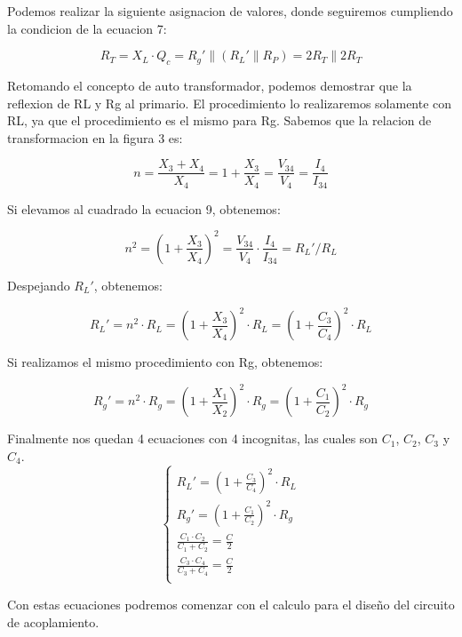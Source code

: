 Podemos realizar la siguiente asignacion de valores, donde seguiremos cumpliendo la condicion de la ecuacion 7:

\begin{equation}
    R_T = X_L \cdot Q_c = R_g' \parallel (R_L' \parallel R_P) = 2 R_T \parallel 2 R_T 
\end{equation}

Retomando el concepto de auto transformador, podemos demostrar que la reflexion de RL y Rg al primario. El procedimiento lo realizaremos solamente con RL, ya que el procedimiento es el mismo para Rg.
Sabemos que la relacion de transformacion en la figura 3 es:

\begin{equation}
    n = \frac{X_3+X_4}{X_4} = 1 + \frac{X_3}{X_4} = \frac{V_{34}}{V_4} = \frac{I_4}{I_{34}}
\end{equation}

Si elevamos al cuadrado la ecuacion 9, obtenemos:

\begin{equation}
    n^2 = (1 + \frac{X_3}{X_4})^2 = \frac{V_{34}}{V_4} \cdot \frac{I_4}{I_{34}} = R_L' / R_L
\end{equation}

Despejando $R_L'$, obtenemos:

\begin{equation}
    R_L' = n^2 \cdot R_L = (1 + \frac{X_3}{X_4})^2 \cdot R_L = (1 + \frac{C_3}{C_4})^2 \cdot R_L
\end{equation}

Si realizamos el mismo procedimiento con Rg, obtenemos:

\begin{equation}
    R_g' = n^2 \cdot R_g = (1 + \frac{X_1}{X_2})^2 \cdot R_g = (1 + \frac{C_1}{C_2})^2 \cdot R_g
\end{equation}

Finalmente nos quedan 4 ecuaciones con 4 incognitas, las cuales son $C_1$, $C_2$, $C_3$ y $C_4$.
\begin{equation}
    \begin{cases}
        R_L' = (1 + \frac{C_3}{C_4})^2 \cdot R_L \\
        R_g' = (1 + \frac{C_1}{C_2})^2 \cdot R_g \\
        \frac{ C_1 \cdot C_2}{C_1 + C_2} = \frac{C}{2} \\
        \frac{ C_3 \cdot C_4}{C_3 + C_4} = \frac{C}{2} \\
    \end{cases}
\end{equation}

Con estas ecuaciones podremos comenzar con el calculo para el diseño del circuito de acoplamiento.


